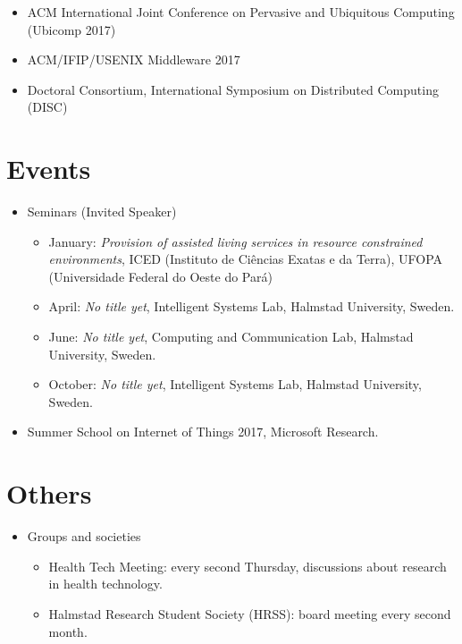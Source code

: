 \documentclass[]{report}
\begin{document}
\begin{itemize}
	\item ACM International Joint Conference on Pervasive and Ubiquitous Computing (Ubicomp 2017)
	\item ACM/IFIP/USENIX Middleware 2017
	\item Doctoral Consortium, International Symposium on Distributed Computing (DISC)
\end{itemize}

\section*{Events}

\begin{itemize}
	\item Seminars (Invited Speaker)
		\begin{itemize}
			\item January: \textit{Provision of assisted living services in resource constrained environments}, ICED (Instituto de Ci\^{e}ncias Exatas e da Terra), UFOPA (Universidade Federal do Oeste do Par\'{a})
			\item April: \textit{No title yet}, Intelligent Systems Lab, Halmstad University, Sweden.
			\item June: \textit{No title yet}, Computing and Communication Lab, Halmstad University, Sweden.
			\item October: \textit{No title yet}, Intelligent Systems Lab, Halmstad University, Sweden.			
		\end{itemize}
	\item Summer School on Internet of Things 2017, Microsoft Research.
\end{itemize}

\section*{Others}
	\begin{itemize}
		\item Groups and societies
		\begin{itemize}
			\item Health Tech Meeting: every second Thursday, discussions about research in health technology.
			\item Halmstad Research Student Society (HRSS): board meeting every second month.
		\end{itemize}
	\end{itemize}
\end{document}
